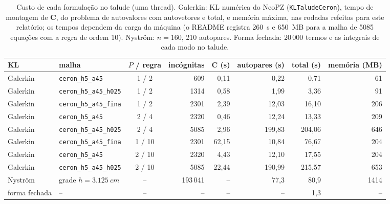 \begin{table}[H]
  \centering
  \caption{Custo de cada formulação no talude (uma thread). Galerkin: KL numérica do NeoPZ (\texttt{KLTaludeCeron}), tempo
    de montagem de $\mathbf{C}$, do problema de autovalores com autovetores e total, e memória máxima, nas rodadas refeitas
    para este relatório; os tempos dependem da carga da máquina (o README registra 260~s e 650~MB para a malha de 5085
    equações com a regra de ordem 10).
    Nyström: $n = 160$, 210 autopares. Forma fechada: 20\,000 termos e as integrais de cada modo no talude.}
  \label{tab:kl:custo}
  \footnotesize
  \setlength{\tabcolsep}{4pt}
  \begin{tabular}{llcrrrrr}
    \toprule
    KL & malha & $P$ / regra & incógnitas & $\mathbf{C}$ (s) & autopares (s) & total (s) & memória (MB) \\
    \midrule
    Galerkin & \texttt{ceron\_h5\_a45}      & 1 / 2  &    609 &  0,11 &   0,22 &   0,71 &  61 \\
    Galerkin & \texttt{ceron\_h5\_a45\_h025} & 1 / 2  &   1314 &  0,58 &   1,99 &   3,36 &  91 \\
    Galerkin & \texttt{ceron\_h5\_a45\_fina} & 1 / 2  &   2301 &  2,39 &  12,03 &  16,10 & 206 \\
    Galerkin & \texttt{ceron\_h5\_a45}      & 2 / 4  &   2320 &  0,46 &  12,24 &  13,33 & 209 \\
    Galerkin & \texttt{ceron\_h5\_a45\_h025} & 2 / 4  &   5085 &  2,96 & 199,83 & 204,06 & 646 \\
    Galerkin & \texttt{ceron\_h5\_a45\_fina} & 1 / 10 &   2301 & 62,15 &  10,84 &  76,67 & 204 \\
    Galerkin & \texttt{ceron\_h5\_a45}      & 2 / 10 &   2320 &  4,43 &  12,10 &  17,55 & 204 \\
    Galerkin & \texttt{ceron\_h5\_a45\_h025} & 2 / 10 &   5085 & 22,44 & 190,99 & 215,57 & 653 \\
    \midrule
    Nyström  & grade $h = \SI{3.125}{cm}$    & --     & 193\,041 & --  &  77,3  &  80,9  & 1414 \\
    forma fechada & --                       & --     & --     & --    & --     &   1,3  & -- \\
    \bottomrule
  \end{tabular}
\end{table}

